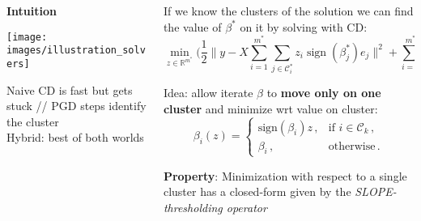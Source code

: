 \documentclass[english,final,t]{beamer}
\newcommand{\bbR}{\mathbb{R}}
\DeclareMathOperator{\sign}{sign}
\begin{document}
\begin{frame}{}
\begin{columns}[t]
\begin{column}{.3\linewidth}
\begin{block}{\textbf{\color{malgared} Intuition}}
		\begin{center}
			\texttt{[image: images/illustration\_solvers]}

			Naive CD is fast but gets stuck // PGD steps identify the cluster \\[5mm]

			Hybrid: best of both worlds
		\end{center}

	\end{block}
\end{column}
\begin{column}{.3\linewidth}
	\begin{block}{\textbf{\color{malgared}{\#1 Clusterwise minimization}}}
		If we know the clusters of the solution we can find the value of $\beta^*$ on it by solving with CD:
		\begin{equation*}
			\min_{z \in \bbR^{m^*}}\bigg(
				\frac{1}{2} \Big\lVert y - X \sum_{i=1}^{m^*} \sum_{j \in \mathcal{C}_i^*} z_i \sign(\beta_j^*) e_j \Big\rVert^2
				+ \sum_{i=1}^{m^*} | z_i | \sum_{j \in \mathcal{C}_i^*} \lambda_j
				\bigg).
		\end{equation*}

		Idea: allow iterate $\beta$ to \textbf{move only on one cluster} and minimize wrt value on cluster:
		\begin{equation*}
			\beta_i(z) =
			\begin{cases}
			  \mathrm{sign}(\beta_i) z   \, , & \text{if } i \in \mathcal{C}_k \, , \\
			  \beta_i \, ,                    & \text{otherwise} \, .
			\end{cases}
		\end{equation*}

		\textbf{\textcolor{malgared}{Property}}: Minimization with respect to a single cluster has a closed-form given by the \emph{SLOPE-thresholding operator}


\end{block}
\end{column}
\end{columns}
\end{frame}
\end{document}

